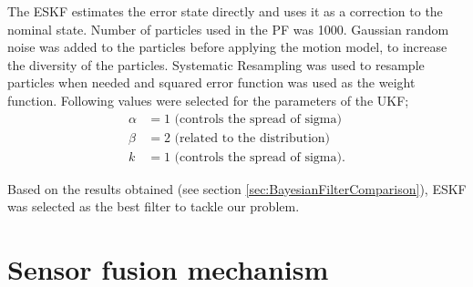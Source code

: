 The \gls{ESKF} estimates the error state directly and uses it as a correction to the nominal state. Number of particles used in the \gls{PF} was 1000. Gaussian random noise was added to the particles before applying the motion model, to increase the diversity of the particles. Systematic Resampling was used to resample particles when needed and squared error function was used as the weight function. Following values were selected for the parameters of the \gls{UKF};
\begin{align}
	\alpha &= 1 \text{ (controls the spread of sigma)}\\
	\beta & = 2 \text{ (related to the distribution)}\\
	k &= 1 \text{ (controls the spread of sigma)}.
\end{align}

Based on the results obtained (see section \ref{sec:BayesianFilterComparison}), \gls{ESKF} was selected as the best filter to tackle our problem.









\section{Sensor fusion mechanism}

